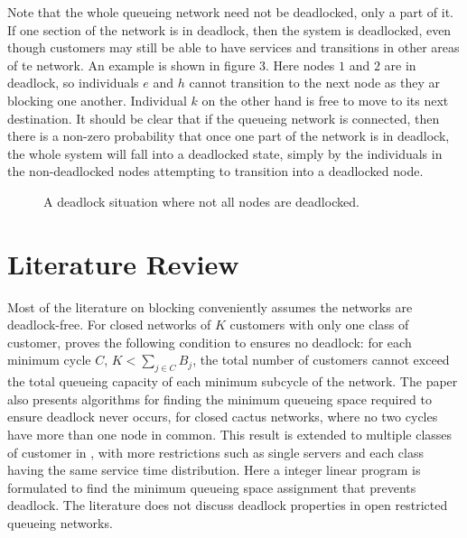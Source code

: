 \documentclass{article}
\begin{document}
Note that the whole queueing network need not be deadlocked, only a part of it.
If one section of the network is in deadlock, then the system is deadlocked, even though customers may still be able to have services and transitions in other areas of te network.
An example is shown in figure 3.
Here nodes $1$ and $2$ are in deadlock, so individuals $e$ and $h$ cannot transition to the next node as they ar blocking one another.
Individual $k$ on the other hand is free to move to its next destination.
It should be clear that if the queueing network is connected, then there is a non-zero probability that once one part of the network is in deadlock, the whole system will fall into a deadlocked state, simply by the individuals in the non-deadlocked nodes attempting to transition into a deadlocked node.\newline

\begin{figure}[H]
  
  \caption{A deadlock situation where not all nodes are deadlocked.}
\end{figure}

\section{Literature Review}

Most of the literature on blocking conveniently assumes the networks are deadlock-free.
For closed networks of $K$ customers with only one class of customer, \cite{kunduakyildiz89} proves the following condition to ensures no deadlock: for each minimum cycle $C$, $K < \sum_{j\in C} B_j$, the total number of customers cannot exceed the total queueing capacity of each minimum subcycle of the network.
The paper also presents algorithms for finding the minimum queueing space required to ensure deadlock never occurs, for closed cactus networks, where no two cycles have more than one node in common.
This result is extended to multiple classes of customer in \cite{liebeherrakyildiz95}, with more restrictions such as single servers and each class having the same service time distribution.
Here a integer linear program is formulated to find the minimum queueing space assignment that prevents deadlock.
The literature does not discuss deadlock properties in open restricted queueing networks.\newline
\end{document}
